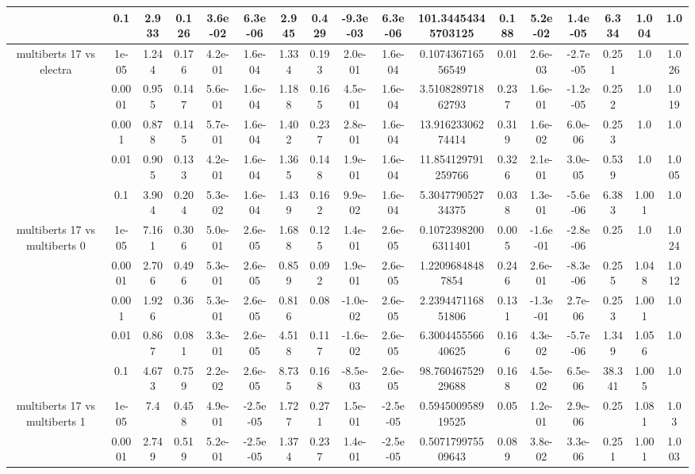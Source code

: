 \begin{tabular}{|c|c|c|c|c|c|c|c|c|c|c|c|c|c|c|c|c|}
 & 0.1 & 2.933 & 0.126 & 3.6e-02 & 6.3e-06 & 2.945 & 0.429 & -9.3e-03 & 6.3e-06 & 101.34454345703125 & 0.188 & 5.2e-02 & 1.4e-05 & 6.334 & 1.004 & 1.0 \\
\hline
\multirow{5}{*}{multiberts 17 vs electra } & 1e-05 & 1.244 & 0.176 & 4.2e-01 & 1.6e-04 & 1.334 & 0.193 & 2.0e-01 & 1.6e-04 & 0.107436716556549 & 0.01 & 2.6e-03 & -2.7e-05 & 0.251 & 1.0 & 1.026 \\
 & 0.0001 & 0.955 & 0.147 & 5.6e-01 & 1.6e-04 & 1.188 & 0.165 & 4.5e-01 & 1.6e-04 & 3.510828971862793 & 0.237 & 1.6e-01 & -1.2e-05 & 0.252 & 1.0 & 1.019 \\
 & 0.001 & 0.878 & 0.145 & 5.7e-01 & 1.6e-04 & 1.402 & 0.237 & 2.8e-01 & 1.6e-04 & 13.91623306274414 & 0.319 & 1.6e-02 & 6.0e-06 & 0.253 & 1.0 & 1.0 \\
 & 0.01 & 0.905 & 0.133 & 4.2e-01 & 1.6e-04 & 1.365 & 0.148 & 1.9e-01 & 1.6e-04 & 11.854129791259766 & 0.326 & 2.1e-01 & 3.0e-05 & 0.539 & 1.0 & 1.005 \\
 & 0.1 & 3.904 & 0.204 & 5.3e-02 & 1.6e-04 & 1.439 & 0.162 & 9.9e-02 & 1.6e-04 & 5.304779052734375 & 0.038 & 1.3e-01 & -5.6e-06 & 6.383 & 1.001 & 1.0 \\
\hline
\multirow{5}{*}{multiberts 17 vs multiberts 0} & 1e-05 & 7.161 & 0.306 & 5.0e-01 & 2.6e-05 & 1.688 & 0.125 & 1.4e-01 & 2.6e-05 & 0.10723982006311401 & 0.005 & -1.6e-01 & -2.8e-06 & 0.25 & 1.0 & 1.024 \\
 & 0.0001 & 2.706 & 0.496 & 5.3e-01 & 2.6e-05 & 0.859 & 0.092 & 1.9e-01 & 2.6e-05 & 1.22096848487854 & 0.246 & 2.6e-01 & -8.3e-06 & 0.255 & 1.048 & 1.012 \\
 & 0.001 & 1.926 & 0.36 & 5.3e-01 & 2.6e-05 & 0.816 & 0.08 & -1.0e-02 & 2.6e-05 & 2.239447116851806 & 0.131 & -1.3e-01 & 2.7e-06 & 0.253 & 1.001 & 1.0 \\
 & 0.01 & 0.867 & 0.081 & 3.3e-01 & 2.6e-05 & 4.518 & 0.117 & -1.6e-02 & 2.6e-05 & 6.300445556640625 & 0.166 & 4.3e-02 & -5.7e-06 & 1.349 & 1.056 & 1.0 \\
 & 0.1 & 4.673 & 0.759 & 2.2e-02 & 2.6e-05 & 8.735 & 0.168 & -8.5e-03 & 2.6e-05 & 98.76046752929688 & 0.168 & 4.5e-02 & 6.5e-06 & 38.341 & 1.005 & 1.0 \\
\hline
\multirow{5}{*}{multiberts 17 vs multiberts 1} & 1e-05 & 7.4 & 0.458 & 4.9e-01 & -2.5e-05 & 1.727 & 0.271 & 1.5e-01 & -2.5e-05 & 0.594500958919525 & 0.05 & 1.2e-01 & 2.9e-06 & 0.25 & 1.081 & 1.03 \\
 & 0.0001 & 2.749 & 0.519 & 5.2e-01 & -2.5e-05 & 1.374 & 0.237 & 1.4e-01 & -2.5e-05 & 0.507179975509643 & 0.089 & 3.8e-02 & 3.3e-06 & 0.251 & 1.001 & 1.003 \\

\end{tabular}
